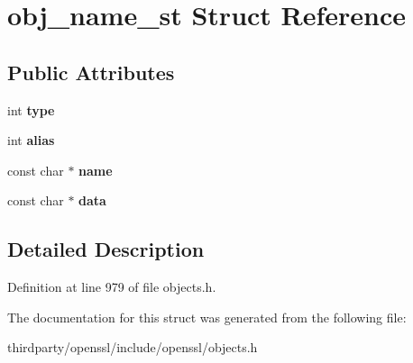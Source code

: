 \hypertarget{structobj__name__st}{}\section{obj\+\_\+name\+\_\+st Struct Reference}
\label{structobj__name__st}
\subsection*{Public Attributes}
\begin{DoxyCompactItemize}
\item 
\mbox{\label{structobj__name__st_ac9b1720c0e892bb82abafa95f4c28bfd}} 
int {\bfseries type}
\item 
\mbox{\label{structobj__name__st_a436535b057606678c612d6e0ff87b301}} 
int {\bfseries alias}
\item 
\mbox{\label{structobj__name__st_a123db40ac48c32bf473c4bdd0dd961fc}} 
const char $\ast$ {\bfseries name}
\item 
\mbox{\label{structobj__name__st_afdb47f10daa01b71995d9b30d696ac68}} 
const char $\ast$ {\bfseries data}
\end{DoxyCompactItemize}


\subsection{Detailed Description}


Definition at line 979 of file objects.\+h.



The documentation for this struct was generated from the following file\+:\begin{DoxyCompactItemize}
\item 
thirdparty/openssl/include/openssl/objects.\+h\end{DoxyCompactItemize}
